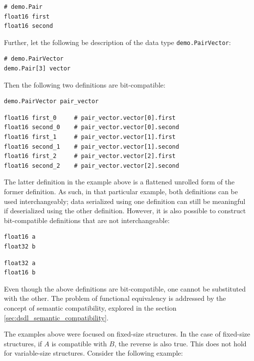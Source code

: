 \begin{verbatim}
# demo.Pair
float16 first
float16 second
\end{verbatim}

Further, let the following be description of the data type \verb|demo.PairVector|:

\begin{verbatim}
# demo.PairVector
demo.Pair[3] vector
\end{verbatim}

Then the following two definitions are bit-compatible:

\begin{verbatim}
demo.PairVector pair_vector
\end{verbatim}

\begin{verbatim}
float16 first_0     # pair_vector.vector[0].first
float16 second_0    # pair_vector.vector[0].second
float16 first_1     # pair_vector.vector[1].first
float16 second_1    # pair_vector.vector[1].second
float16 first_2     # pair_vector.vector[2].first
float16 second_2    # pair_vector.vector[2].second
\end{verbatim}

The latter definition in the example above is a flattened unrolled form of the former definition.
As such, in that particular example, both definitions can be used interchangeably;
data serialized using one definition can still be meaningful if deserialized using the other definition.
However, it is also possible to construct bit-compatible definitions that are not interchangeable:

\begin{verbatim}
float16 a
float32 b
\end{verbatim}

\begin{verbatim}
float32 a
float16 b
\end{verbatim}

Even though the above definitions are bit-compatible, one cannot be substituted with the other.
The problem of functional equivalency is addressed by the concept of semantic compatibility,
explored in the section \ref{sec:dsdl_semantic_compatibility}.

The examples above were focused on fixed-size structures.
In the case of fixed-size structures, if $A$ is compatible with $B$, the reverse is also true.
This does not hold for variable-size structures.
Consider the following example:

